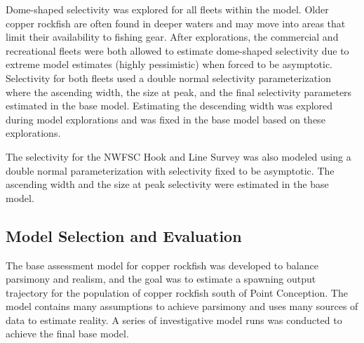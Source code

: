 \documentclass[11pt,
  english,
  a4paper,
]{article}
\begin{document}
\leavevmode\tagmcend\tagstructend\par


Dome-shaped selectivity was explored for all fleets within the model. Older copper rockfish are often found in deeper waters and may move into areas that limit their availability to fishing gear. After explorations, the commercial and recreational fleets were both allowed to estimate dome-shaped selectivity due to extreme model estimates (highly pessimistic) when forced to be asymptotic. Selectivity for both fleets used a double normal selectivity parameterization where the ascending width, the size at peak, and the final selectivity parameters estimated in the base model. Estimating the descending width was explored during model explorations and was fixed in the base model based on these explorations.

\leavevmode\tagmcend\tagstructend\par


The selectivity for the NWFSC Hook and Line Survey was also modeled using a double normal parameterization with selectivity fixed to be asymptotic. The ascending width and the size at peak selectivity were estimated in the base model.

\leavevmode\tagmcend\tagstructend\par


\hypertarget{model-selection-and-evaluation}{%
\subsection{Model Selection and Evaluation}\label{model-selection-and-evaluation}}

\leavevmode\tagmcend\tagstructend


The base assessment model for copper rockfish was developed to balance parsimony and realism, and the goal was to estimate a spawning output trajectory for the population of copper rockfish south of Point Conception. The model contains many assumptions to achieve parsimony and uses many sources of data to estimate reality. A series of investigative model runs was conducted to achieve the final base model.

\leavevmode\tagmcend\tagstructend\par
\end{document}
